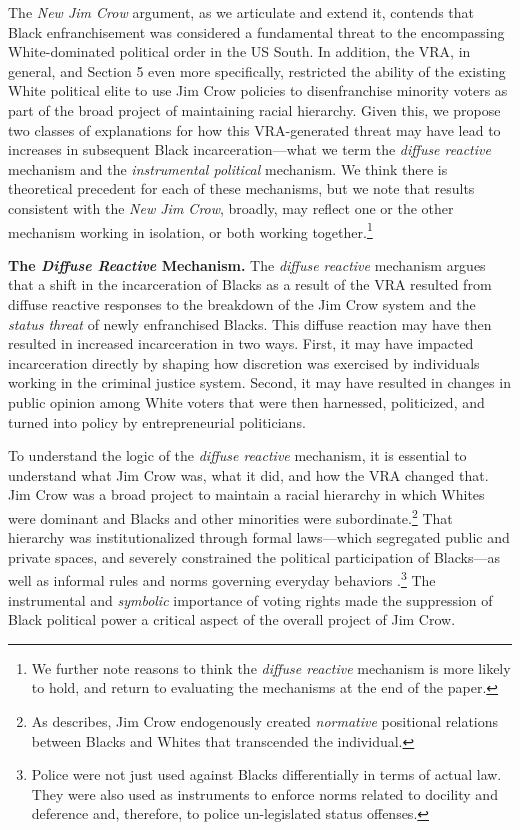 \documentclass[12pt]{article}
\begin{document}
The \emph{New Jim Crow} argument, as we articulate and extend it, contends that Black enfranchisement was considered a fundamental threat to the encompassing White-dominated political order in the US South.  In addition, the VRA, in general, and Section 5 even more specifically, restricted the ability of the existing White political elite to use Jim Crow policies to disenfranchise minority voters as part of the broad project of maintaining racial hierarchy. Given this, we propose two classes of explanations for how this VRA-generated threat may have lead to increases in subsequent Black incarceration---what we term the \emph{diffuse reactive} mechanism and the \emph{instrumental political} mechanism.  We think there is theoretical precedent for each of these mechanisms, but we note that results consistent with the \emph{New Jim Crow}, broadly, may reflect one or the other mechanism working in isolation, or both working together.\footnote{We further note reasons to think the \emph{diffuse reactive} mechanism is more likely to hold, and return to evaluating the mechanisms at the end of the paper.}



\vspace{.12in}
\textbf{The \emph{Diffuse Reactive} Mechanism.} \text{  } The \emph{diffuse reactive} mechanism argues that a shift in the incarceration of Blacks as a result of the VRA resulted from diffuse reactive responses to the breakdown of the Jim Crow system and the \emph{status threat} of newly enfranchised Blacks. This diffuse reaction may have then resulted in increased incarceration in two ways. First, it may have impacted incarceration directly by shaping how discretion was exercised by individuals working in the criminal justice system. Second, it may have resulted in changes in public opinion among White voters that were then harnessed, politicized, and turned into policy by entrepreneurial politicians.

To understand the logic of the \emph{diffuse reactive} mechanism, it is essential to understand what Jim Crow was, what it did, and how the VRA changed that.  Jim Crow was a broad project to maintain a racial hierarchy in which Whites were dominant and Blacks and other minorities were subordinate.\footnote{As \cite{Blumer:1958ue} describes, Jim Crow endogenously created \emph{normative} positional relations between Blacks and Whites that transcended the individual. }  That hierarchy was institutionalized through formal laws---which segregated public and private spaces, and severely constrained the political participation of Blacks---as well as informal rules and norms governing everyday behaviors \citep{Kennedy:1990vt,Berrey:2016wm}.\footnote{Police were not just used against Blacks differentially in terms of actual law.  They were also used as instruments to enforce norms related to docility and deference and, therefore, to police un-legislated status offenses.}  The instrumental and \emph{symbolic} importance of voting rights made the suppression of Black political power a critical aspect of the overall project of Jim Crow.
\end{document}
